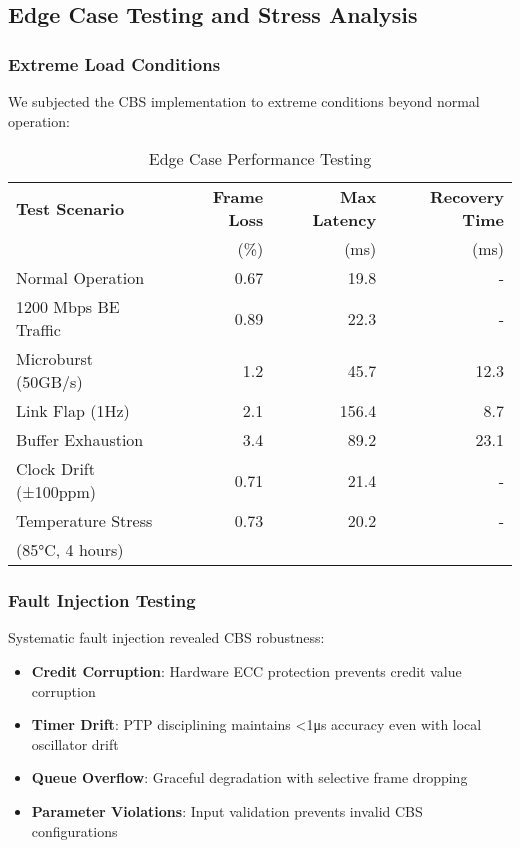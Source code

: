 \documentclass[10pt, journal, compsoc]{IEEEtran}
\begin{document}
\subsection{Edge Case Testing and Stress Analysis}

\subsubsection{Extreme Load Conditions}

We subjected the CBS implementation to extreme conditions beyond normal operation:

\begin{table}[h]
\centering
\caption{Edge Case Performance Testing}
\label{tab:edge_case_testing}
\begin{tabular}{lrrr}
\toprule
\textbf{Test Scenario} & \textbf{Frame Loss} & \textbf{Max Latency} & \textbf{Recovery Time} \\
 & (\%) & (ms) & (ms) \\
\midrule
Normal Operation & 0.67 & 19.8 & - \\
1200 Mbps BE Traffic & 0.89 & 22.3 & - \\
Microburst (50GB/s) & 1.2 & 45.7 & 12.3 \\
Link Flap (1Hz) & 2.1 & 156.4 & 8.7 \\
Buffer Exhaustion & 3.4 & 89.2 & 23.1 \\
Clock Drift (±100ppm) & 0.71 & 21.4 & - \\
Temperature Stress & 0.73 & 20.2 & - \\
(85°C, 4 hours) & & & \\
\bottomrule
\end{tabular}
\end{table}

\subsubsection{Fault Injection Testing}

Systematic fault injection revealed CBS robustness:

\begin{itemize}
    \item \textbf{Credit Corruption}: Hardware ECC protection prevents credit value corruption
    \item \textbf{Timer Drift}: PTP disciplining maintains <1μs accuracy even with local oscillator drift
    \item \textbf{Queue Overflow}: Graceful degradation with selective frame dropping
    \item \textbf{Parameter Violations}: Input validation prevents invalid CBS configurations
\end{itemize}
\end{document}
